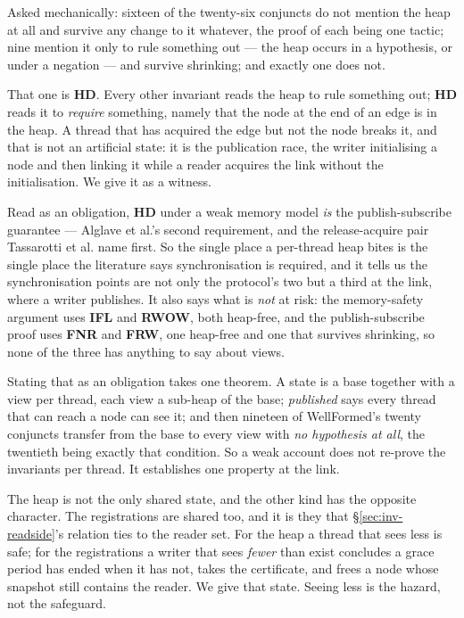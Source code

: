 Asked mechanically: sixteen of the twenty-six conjuncts do not mention the heap
at all and survive any change to it whatever, the proof of each being one
tactic; nine mention it only to rule something out --- the heap occurs in a
hypothesis, or under a negation --- and survive shrinking; and exactly one does
not.

That one is \textbf{HD}.  Every other invariant reads the heap to rule
something out; \textbf{HD} reads it to \emph{require} something, namely that
the node at the end of an edge is in the heap.  A thread that has acquired the
edge but not the node breaks it, and that is not an artificial state: it is the
publication race, the writer initialising a node and then linking it while a
reader acquires the link without the initialisation.  We give it as a witness.

Read as an obligation, \textbf{HD} under a weak memory model \emph{is} the
publish-subscribe guarantee --- Alglave et al.'s second requirement, and the
release-acquire pair Tassarotti et al. name first.  So the single place a
per-thread heap bites is the single place the literature says synchronisation
is required, and it tells us the synchronisation points are not only the
protocol's two but a third at the link, where a writer publishes.  It also says
what is \emph{not} at risk: the memory-safety argument uses \textbf{IFL} and
\textbf{RWOW}, both heap-free, and the publish-subscribe proof uses
\textbf{FNR} and \textbf{FRW}, one heap-free and one that survives shrinking,
so none of the three has anything to say about views.

Stating that as an obligation takes one theorem.  A state is a base together
with a view per thread, each view a sub-heap of the base; \emph{published} says
every thread that can reach a node can see it; and then nineteen of
\textsf{WellFormed}'s twenty conjuncts transfer from the base to every view
with \emph{no hypothesis at all}, the twentieth being exactly that condition.
So a weak account does not re-prove the invariants per thread.  It establishes
one property at the link.

The heap is not the only shared state, and the other kind has the opposite
character.  The registrations are shared too, and it is they that
\S\ref{sec:inv-readside}'s relation ties to the reader set.  For the heap a
thread that sees less is safe; for the registrations a writer that sees
\emph{fewer} than exist concludes a grace period has ended when it has not,
takes the certificate, and frees a node whose snapshot still contains the
reader.  We give that state.  Seeing less is the hazard, not the safeguard.

